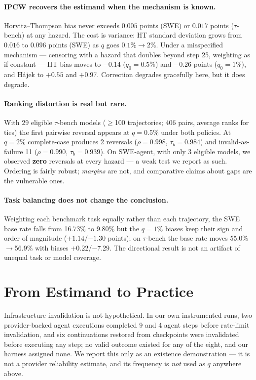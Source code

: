 \documentclass[letterpaper]{article}
\begin{document}
\paragraph{IPCW recovers the estimand when the mechanism is known.}
Horvitz--Thompson bias never exceeds $0.005$ points (SWE) or $0.017$ points
($\tau$-bench) at any hazard. The cost is variance: HT standard deviation grows
from $0.016$ to $0.096$ points (SWE) as $q$ goes $0.1\%\!\to\!2\%$. Under a
misspecified mechanism --- censoring with a hazard that doubles beyond step 25,
weighting as if constant --- HT bias moves to $-0.14$ ($q_0=0.5\%$) and $-0.26$
points ($q_0=1\%$), and H\'ajek to $+0.55$ and $+0.97$. Correction degrades
gracefully here, but it does degrade.

\paragraph{Ranking distortion is real but rare.}
With 29 eligible $\tau$-bench models ($\geq$100 trajectories; 406 pairs, average
ranks for ties) the first pairwise reversal appears at $q=0.5\%$ under both
policies. At $q=2\%$ complete-case produces 2 reversals ($\rho=0.998$,
$\tau_b=0.984$) and invalid-as-failure 11 ($\rho=0.990$, $\tau_b=0.939$). On
SWE-agent, with only 3 eligible models, we observed \textbf{zero} reversals at
every hazard --- a weak test we report as such. Ordering is fairly robust;
\emph{margins} are not, and comparative claims about gaps are the vulnerable
ones.

\paragraph{Task balancing does not change the conclusion.}
Weighting each benchmark task equally rather than each trajectory, the SWE base
rate falls from 16.73\% to 9.80\% but the $q=1\%$ biases keep their sign and
order of magnitude ($+1.14$/$-1.30$ points); on $\tau$-bench the base rate moves
55.0\%$\to$56.9\% with biases $+0.22$/$-7.29$. The directional result is not an
artifact of unequal task or model coverage.

\section{From Estimand to Practice}
\label{sec:practice}

Infrastructure invalidation is not hypothetical. In our own instrumented runs,
two provider-backed agent executions completed 9 and 4 agent steps before
rate-limit invalidation, and six continuations restored from checkpoints were
invalidated before executing any step; no valid outcome existed for any of the
eight, and our harness assigned none. We report this only as an existence
demonstration --- it is not a provider reliability estimate, and its frequency
is \emph{not} used as $q$ anywhere above.
\end{document}

